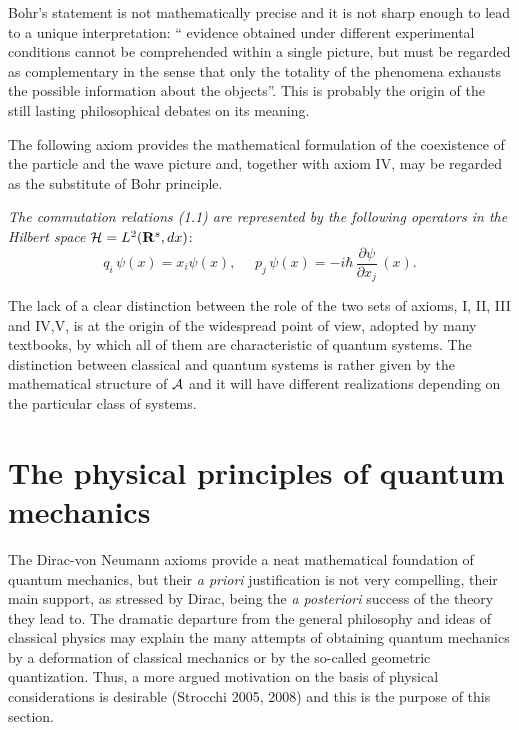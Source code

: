 \documentclass[12pt]{article}
\def \be {\begin{equation}}
\def \ee {\end{equation}}
\def \A {{\cal A}}
\def \H {\mbox{${\cal H}$}}
\def \Rbf {{\bf R}}
\begin{document}
Bohr's  statement is not  mathematically precise and it is not sharp enough to lead to a unique interpretation: `` evidence obtained under different experimental conditions cannot be comprehended within a single picture, but must be regarded as complementary in the sense that only the totality of the phenomena exhausts the possible information about the objects''. This is probably the origin of the still lasting philosophical debates on its meaning.

The following axiom  provides the mathematical formulation of the coexistence of the particle and the wave picture and, together with axiom IV, may be regarded as the substitute of Bohr principle.

  \vspace{1mm}  {\em The commutation relations (1.1) are represented by the following operators in the Hilbert space} $\H = L^2(\Rbf^s, d x)$: 
\be{q_i \,\psi(x) = x_i \psi(x), \,\,\,\,\,\,\,\,p_j \,\psi(x) = - i \hbar\, \frac{\partial \psi}{\partial x_j}\,(x).}\ee

\def \Sch  {{Schr\"{o}\-din\-ger\,}}

The lack  of a clear distinction between the role of the  two sets of axioms, I, II, III and IV,V, is at the origin of the widespread point of view, adopted by many textbooks, by which all of them are characteristic of quantum systems.
 The distinction between classical and quantum systems is rather given by the mathematical structure of  $\A$ and it will have different realizations depending on the particular class of systems.  





\section{The physical principles of quantum mechanics}

The Dirac-von Neumann axioms provide a neat mathematical foundation of quantum mechanics, but their {\em a priori} justification is not very compelling, their main support, as stressed by Dirac, being  the {\em a posteriori} success of the theory they lead to. 
The dramatic departure from the general philosophy and ideas  of classical physics may explain  the many attempts of obtaining quantum mechanics by a deformation of classical mechanics or by the so-called geometric quantization. Thus, a more argued motivation on the basis of physical considerations is desirable (Strocchi 2005, 2008) and this is the purpose of this section. 
\end{document}
